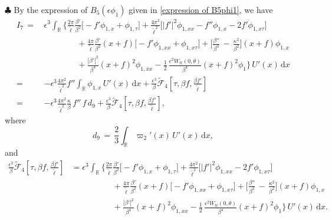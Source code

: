 \documentclass[10pt, reqno]{amsart}
\numberwithin{equation}{section}
\theoremstyle{definition}
\begin{document}
{\smallskip\noindent$\clubsuit$
By the expression of $B_5(\epsilon \phi_1)$ given in \eqref{expression of B5phi1}, we have
\begin{align}\label{I7}
I_7
 \, =\,&\epsilon^3
\int_{{\mathbb R}}\Bigg\{\frac{2\pi}{{\tilde\ell}}\frac{\beta'} {\beta^2}\Big[- f' \phi_{1,x} +\phi_{1,\tau}\Big]
 +\frac{4\pi^2}{{\tilde\ell}^2}\Big[|f'|^2 \phi_{1,xx} -f''\phi_{1,x} -2f' \phi_{1,x\tau}\Big]
\nonumber\\[2mm]
&\qquad\qquad
+ \frac{4\pi}{{\tilde\ell}} \frac{\beta'}{\beta^2} (x+f)\big[- f' \phi_{1,xx} +\phi_{1,x\tau}\big]
+\Big[\frac{\beta''}{\beta^3} \,-\,\frac{\kappa^2}{\beta^2} \Big]
(x+f) \phi_{1,x}
\nonumber\\[2mm]
&\qquad\qquad
+ \frac{|\beta'|^2}{\beta^4}(x+f)^2 \phi_{1,xx}
-\frac{1}{2}\, \frac{\epsilon^2W_{tt}(0, \theta)}{\beta^4} (x+f)^2\phi_{1}
\Bigg\} \, U'(x) \,{\mathrm d}x
\nonumber\\[2mm]
=& - \epsilon^3 \frac{4\pi^2}{{\tilde\ell}^2} f'' \int_{{\mathbb R}} \phi_{1,x}\, U'(x) \,{\mathrm d}x
+\frac{\epsilon^3}{\beta}\tilde{\mathcal F}_4\left[\tau, \beta f, \frac{\beta {f}'}{\tilde\ell} \right]
\nonumber\\[2mm]
=& - \epsilon^3 \frac{4\pi^2}{{\tilde\ell}^2}  \frac{\kappa}{\beta}\,f''\,f\, d_9
+\frac{\epsilon^3}{\beta}\tilde{\mathcal F}_4\left[\tau, \beta f, \frac{\beta {f}'}{\tilde\ell} \right],
\end{align}
 where
\begin{equation*}
d_9\,=\,\frac{2}{3}\int_{{\mathbb R}}\varpi_2'(x)\,U'(x)\,{\mathrm d}x,
\end{equation*}
and
\begin{align}\label{B5phi1 intergral Ux}
 \frac{\epsilon^3}{\beta}\tilde{\mathcal F}_4\left[\tau, \beta f, \frac{\beta {f}'}{\tilde\ell} \right]
 &=
\epsilon^3
\int_{{\mathbb R}}\Bigg\{\frac{2\pi}{{\tilde\ell}}\frac{\beta'} {\beta^2}\Big[- f' \phi_{1,x} +\phi_{1,\tau}\Big]
 +\frac{4\pi^2}{{\tilde\ell}^2}\Big[|f'|^2 \phi_{1,xx} -2f' \phi_{1,x\tau}\Big]
\nonumber\\[2mm]
&\qquad\qquad\quad
+ \frac{4\pi}{{\tilde\ell}} \frac{\beta'}{\beta^2} (x+f)\big[- f' \phi_{1,xx} +\phi_{1,x\tau}\big]
+\Big[\frac{\beta''}{\beta^3} \,-\,\frac{\kappa^2}{\beta^2} \Big]
(x+f) \phi_{1,x}
\nonumber\\[2mm]
&\qquad\qquad\quad
+ \frac{|\beta'|^2}{\beta^4}(x+f)^2 \phi_{1,xx}
-\frac{1}{2}\, \frac{\epsilon^2W_{tt}(0, \theta)}{\beta^4} (x+f)^2\phi_{1}
\Bigg\} \, U'(x) \,{\mathrm d}x.
\end{align}


}
\end{document}
